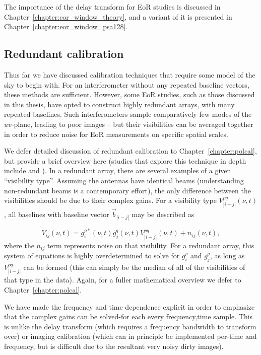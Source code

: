 The importance of the delay transform for EoR studies is discussed in Chapter~\ref{chapter:eor_window_theory}, and a variant of it is presented in Chapter~\ref{chapter:eor_window_psa128}.

\subsection{Redundant calibration}

Thus far we have discussed calibration techniques that require some model of the sky to begin with. For an interferometer without any repeated baseline vectors, these methods are sufficient. However, some EoR studies, such as those discussed in this thesis, have opted to construct highly redundant arrays, with many repeated baselines. Such interferometers sample comparatively few modes of the $uv$-plane, leading to poor images -- but their visibilities can be averaged together in order to reduce noise for EoR measurements on specific spatial scales.

We defer detailed discussion of redundant calibration to Chapter~\ref{chapter:polcal}, but provide a brief overview here (studies that explore this technique in depth include \cite{Wieringa.92, Liu.10, Zheng.14} and \cite{Dillon.17}). In a redundant array, there are several examples of a given ``visibility type''. Assuming the antennas have identical beams (understanding non-redundant beams is a contemporary effort), the only difference between the visibilities should be due to their complex gains. For a visibility type $V^{pq}_{|i-j|}(\nu, t)$, all baselines with baseline vector $\vec{b}_{|i-j|}$ may be described as 

\begin{equation}
V_{ij}(\nu, t) = g^{p*}_i(\nu, t)  g^{q}_j(\nu, t) V^{pq}_{|i-j|}(\nu, t) + n_{ij}(\nu,t),
\label{eq:interferometry_redcal}
\end{equation}
where the $n_{ij}$ term represents noise on that visibility. For a redundant array, this system of equations is highly overdetermined to solve for $g^p_i$ and $ g^{q}_j$, as long as $V^{pq}_{|i-j|}$ can be formed (this can simply be the median of all of the visibilities of that type in the data). Again, for a fuller mathematical overview we defer to Chapter~\ref{chapter:polcal}.

We have made the frequency and time dependence explicit in order to emphasize that the complex gains can be solved-for each every frequency,time sample. This is unlike the delay transform (which requires a frequency bandwidth to transform over) or imaging calibration (which can in principle be implemented per-time and frequency, but is difficult due to the resultant very noisy dirty images). 

